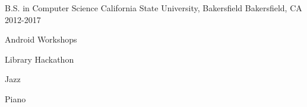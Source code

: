 

\begin{cventries}

  \cventry
    {B.S. in Computer Science} %
    {California State University, Bakersfield} %
    {Bakersfield, CA} %
    {2012-2017} %
    {
      \begin{cvitems} %
        \item {Android Workshops}
        \item {Library Hackathon}
        \item {Jazz}
        \item {Piano}
      \end{cvitems}
    }

\end{cventries}
